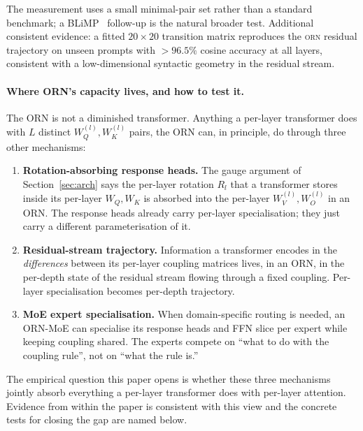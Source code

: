 \documentclass[10pt,twocolumn]{article}
\newcommand{\orn}{\textsc{orn}}
\begin{document}
The measurement uses a small minimal-pair set rather than a standard benchmark; a BLiMP~\cite{warstadt2020blimp} follow-up is the natural broader test. Additional consistent evidence: a fitted $20 \times 20$ transition matrix reproduces the \orn{} residual trajectory on unseen prompts with $>96.5\%$ cosine accuracy at all layers, consistent with a low-dimensional syntactic geometry in the residual stream.

\paragraph{Where ORN's capacity lives, and how to test it.}

The ORN is not a diminished transformer. Anything a per-layer transformer does with $L$ distinct $W_Q^{(l)}, W_K^{(l)}$ pairs, the ORN can, in principle, do through three other mechanisms:

\begin{enumerate}[nosep,leftmargin=1.5em]
\item \textbf{Rotation-absorbing response heads.} The gauge argument of Section~\ref{sec:arch} says the per-layer rotation $R_l$ that a transformer stores inside its per-layer $W_Q, W_K$ is absorbed into the per-layer $W_V^{(l)}, W_O^{(l)}$ in an ORN. The response heads already carry per-layer specialisation; they just carry a different parameterisation of it.
\item \textbf{Residual-stream trajectory.} Information a transformer encodes in the \emph{differences} between its per-layer coupling matrices lives, in an ORN, in the per-depth state of the residual stream flowing through a fixed coupling. Per-layer specialisation becomes per-depth trajectory.
\item \textbf{MoE expert specialisation.} When domain-specific routing is needed, an ORN-MoE can specialise its response heads and FFN slice per expert while keeping coupling shared. The experts compete on ``what to do with the coupling rule'', not on ``what the rule is.''
\end{enumerate}

The empirical question this paper opens is whether these three mechanisms jointly absorb everything a per-layer transformer does with per-layer attention. Evidence from within the paper is consistent with this view and the concrete tests for closing the gap are named below.
\end{document}
